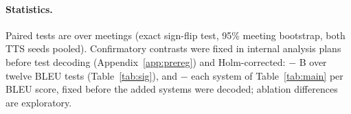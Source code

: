 \paragraph{Statistics.} Paired tests are over meetings (exact sign-flip test, 95\% meeting bootstrap, both TTS seeds
pooled). Confirmatory contrasts were fixed in internal analysis plans before test decoding (Appendix~\ref{app:prereg})
and Holm-corrected: \sys{} $-$ B over twelve BLEU tests (Table~\ref{tab:sig}), and \sys{} $-$ each system of
Table~\ref{tab:main} per BLEU score, fixed before the added systems were decoded; ablation differences are
exploratory.
